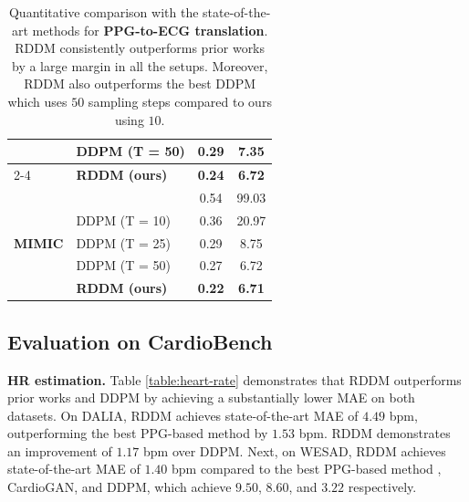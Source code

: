 \documentclass[letterpaper]{article} %
\begin{document}
\begin{table}[t]
\begin{tabular}{@{}llcc@{}}
& DDPM (T = 50) & 0.29 & 7.35\\
\cmidrule{2-4}
& \textbf{RDDM (ours)} & \textbf{0.24} & \textbf{6.72}\\
\midrule
\multirow{5}{*}{\textbf{MIMIC}} & \cite{sarkar2021cardiogan} & 0.54 & 99.03\\
& DDPM (T = 10) & 0.36 & 20.97 \\
& DDPM (T = 25) & 0.29 &  8.75 \\
& DDPM (T = 50) & 0.27 & 6.72\\
\cmidrule{2-4}
& \textbf{RDDM (ours)} & \textbf{0.22} & \textbf{6.71}\\
\bottomrule
\end{tabular}
\caption{Quantitative comparison with the state-of-the-art methods for \textbf{PPG-to-ECG translation}. RDDM consistently outperforms prior works by a large margin in all the setups. Moreover, RDDM also outperforms the best DDPM which uses $50$ sampling steps compared to ours using $10$.
}
\label{table:comparison}
\end{table}

\subsection{Evaluation on CardioBench}

\noindent\textbf{HR estimation. } Table \ref{table:heart-rate} demonstrates that RDDM outperforms prior works and DDPM by achieving a substantially lower MAE on both datasets. On DALIA, RDDM achieves state-of-the-art MAE of $4.49$ bpm, outperforming the best PPG-based method \cite{song2021ppg} by $1.53$ bpm. RDDM demonstrates an improvement of $1.17$ bpm over DDPM. Next, on WESAD, RDDM achieves state-of-the-art MAE of $1.40$ bpm compared to the best PPG-based method \cite{reiss2019deep}, CardioGAN, and DDPM, which achieve $9.50$, $8.60$, and $3.22$ respectively.
\end{document}
